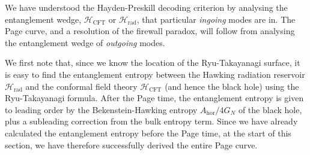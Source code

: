 \documentclass[12pt]{article}
\begin{document}
We have understood the Hayden-Preskill decoding criterion by analysing the entanglement wedge, $\mathcal{H}_\text{CFT}$ or $\mathcal{H}_\text{rad}$, that particular \emph{ingoing} modes are in. The Page curve, and a resolution of the firewall paradox, will follow from analysing the entanglement wedge of \emph{outgoing} modes.

We first note that, since we know the location of the Ryu-Takayanagi surface, it is easy to find the entanglement entropy between the Hawking radiation reservoir $\mathcal{H}_\text{rad}$ and the conformal field theory $\mathcal{H}_\text{CFT}$ (and hence the black hole) using the Ryu-Takayanagi formula. After the Page time, the entanglement entropy is given to leading order by the Bekenstein-Hawking entropy $A_\text{hor}/4G_N$ of the black hole, plus a subleading correction from the bulk entropy term. Since we have already calculated the entanglement entropy before the Page time, at the start of this section, we have therefore successfully derived the entire Page curve.
\end{document}
